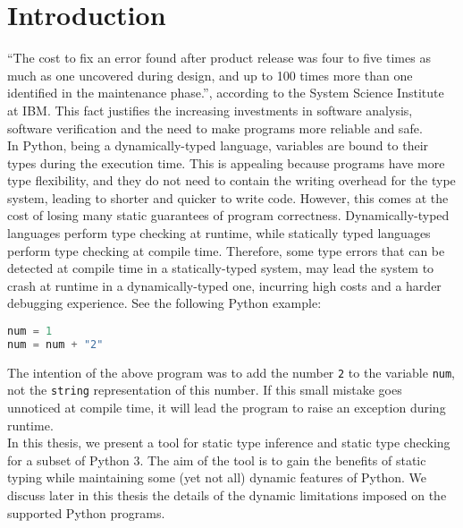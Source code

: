 
\chapter{Introduction}\label{chapter:introduction}

“The cost to fix an error found after product release was four to five times as much as one uncovered during design, and up to 100 times more than one identified in the maintenance phase.”, according to the System Science Institute at IBM. This fact justifies the increasing investments in software analysis, software verification and the need to make programs more reliable and safe.\\

In Python, being a dynamically-typed language, variables are bound to their types during the execution time. This is appealing because programs have more type flexibility, and they do not need to contain the writing overhead for the type system, leading to shorter and quicker to write code. However, this comes at the cost of losing many static guarantees of program correctness. Dynamically-typed languages perform type checking at runtime, while statically typed languages perform type checking at compile time. Therefore, some type errors that can be detected at compile time in a statically-typed system, may lead the system to crash at runtime in a dynamically-typed one, incurring high costs and a harder debugging experience. See the following Python example:
\begin{lstlisting}[language=python]
num = 1
num = num + "2"
\end{lstlisting}
The intention of the above program was to add the number \lstinline|2| to the variable \lstinline|num|, not the \lstinline|string| representation of this number. If this small mistake goes unnoticed at compile time, it will lead the program to raise an exception during runtime.\\

In this thesis, we present a tool for static type inference and static type checking for a subset of Python 3. The aim of the tool is to gain the benefits of static typing while maintaining some (yet not all) dynamic features of Python. We discuss later in this thesis the details of the dynamic limitations imposed on the supported Python programs.\\

